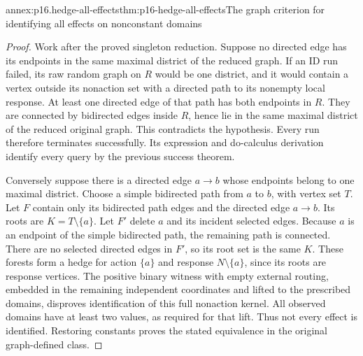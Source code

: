 \begin{annexitem}{annex:p16.hedge-all-effects}{thm:p16-hedge-all-effects}{The graph criterion for identifying all effects on nonconstant domains}
\begin{proof}
Work after the proved singleton reduction. Suppose no directed edge
has its endpoints in the same maximal district of the reduced
graph. If an ID run failed, its raw random graph on \(R\) would
be one district, and it would contain a vertex outside its nonaction
set with a directed path to its nonempty local response. At least
one directed edge of that path has both endpoints in \(R\).
They are connected by bidirected edges inside \(R\), hence lie
in the same maximal district of the reduced original graph. This
contradicts the hypothesis. Every run therefore terminates successfully.
Its expression and do-calculus derivation identify every query by
the previous success theorem.

Conversely suppose there is a directed edge \(a\to b\) whose
endpoints belong to one maximal district. Choose a simple bidirected
path from \(a\) to \(b\), with vertex set \(T\). Let
\(F\) contain only its bidirected path edges and the directed
edge \(a\to b\). Its roots are \(K=T\setminus\{a\}\).
Let \(F'\) delete \(a\) and its incident selected edges.
Because \(a\) is an endpoint of the simple bidirected path,
the remaining path is connected. There are no selected directed
edges in \(F'\), so its root set is the same \(K\).
These forests form a hedge for action \(\{a\}\) and response
\(N\setminus\{a\}\), since its roots are response vertices.
The positive binary witness with empty external routing, embedded
in the remaining independent coordinates and lifted to the prescribed
domains, disproves identification of this full nonaction kernel.
All observed domains have at least two values, as required for
that lift. Thus not every effect is identified. Restoring constants
proves the stated equivalence in the original graph-defined class.
\end{proof}
\end{annexitem}

